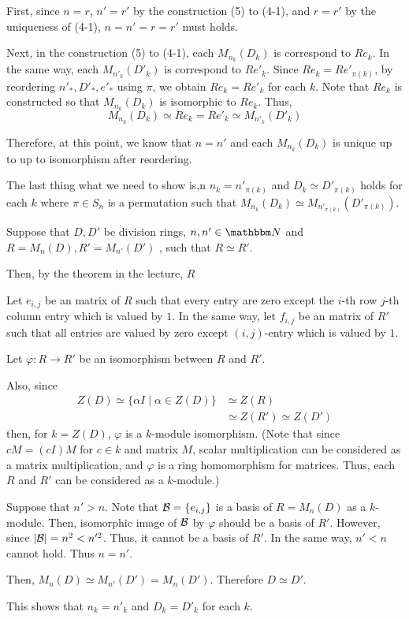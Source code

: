 First, since \(n = r\), \(n' = r'\) by the construction (5) to (4-1),
and \(r = r'\) by the uniqueness of (4-1),
\(n = n' = r = r'\) must holds.

Next, in the construction (5) to (4-1),
each \(M_{n_k}(D_k)\) is correspond to \(Re_k\).
In the same way, each \(M_{n'_k}(D'_k)\) is correspond to \(R e'_k\).
Since \(R e_k = Re'_{\pi(k)}\),
by reordering \(n'_*, D'_*, e'_*\) using \(\pi\),
we obtain \(R e_k = R e'_k\) for each \(k\).
Note that \(R e_k\) is constructed
so that \(M_{n_k}(D_k)\) is isomorphic to \(R e_k\).
Thus,
\[M_{n_k}(D_k) \simeq R e_k = R e'_k \simeq M_{n'_k}(D'_k)\]

Therefore, at this point,
we know that \(n = n'\)
and each \(M_{n_k}(D_k)\) is unique up to up to isomorphism
after reordering.

The last thing what we need to show is,n
\(n_k = n'_{\pi(k)}\) and \(D_k \simeq D'_{\pi(k)}\) holds for each \(k\)
where \(\pi \in S_n\) is a permutation such that
\(M_{n_k}(D_k) \simeq M_{n'_{\pi(k)}}(D'_{\pi(k)})\).

Suppose that \(D, D'\) be division rings, \(n, n' \in \bbN\)
and \(R = M_n(D), R' = M_{n'}(D')\) ,
such that \(R \simeq R'\).

Then, by the theorem in the lecture,
\(R\)

Let \(e_{i,j}\) be an matrix of \(R\)
such that every entry are zero except the \(i\)-th row \(j\)-th column entry
which is valued by \(1\).
In the same way, let \(f_{i,j}\) be an matrix of \(R'\)
such that all entries are valued by zero except \((i, j)\)-entry which is valued
by \(1\).

Let \(\varphi: R \to R'\) be an isomorphism between \(R\) and \(R'\).

Also, since
\begin{align*}
  Z(D) \simeq \{\alpha I \mid \alpha \in Z(D)\} &\simeq Z(R)
  \\&\simeq Z(R') \simeq Z(D')
\end{align*}
then, for \(k = Z(D)\),
\(\varphi\) is a \(k\)-module isomorphism.
(Note that since \(cM = (cI)M\)
for \(c \in k\) and matrix \(M\),
scalar multiplication can be considered as a matrix multiplication,
and \(\varphi\) is a ring homomorphism for matrices.
Thus, each \(R\) and \(R'\) can be considered as a \(k\)-module.)

Suppose that \(n' > n\).
Note that \(\mathcal{B} = \{e_{i, j}\}\) is a basis of \(R = M_n(D)\)
as a \(k\)-module.
Then, isomorphic image of \(\mathcal{B}\) by \(\varphi\)
should be a basis of \(R'\).
However, since \(|\mathcal{B}| = n^2 < n'^2\).
Thus, it cannot be a basis of \(R'\).
In the same way, \(n' < n\) cannot hold.
Thus \(n = n'\).

Then, \(M_n(D) \simeq M_{n'}(D') = M_n(D')\).
Therefore \(D \simeq D'\).

This shows that \(n_k = n'_k\) and \(D_k = D'_k\) for each \(k\).
\qedsq
